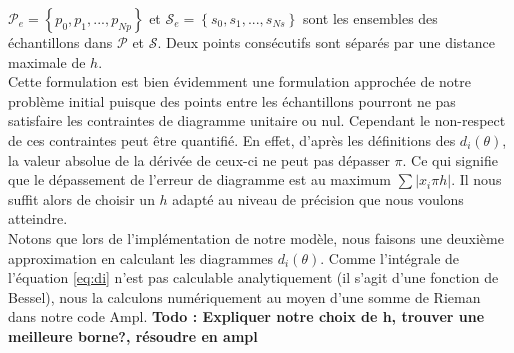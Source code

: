 $\mathcal{P}_e = \left\lbrace p_0,p_1,...,p_{Np}\right\rbrace$ et $\mathcal{S}_e= \left\lbrace s_0,s_1,...,s_{Ns}\right\rbrace$ sont les ensembles des échantillons dans $\mathcal{P}$ et $\mathcal{S}$. Deux points consécutifs sont séparés par une distance maximale de $h$.\\
Cette formulation est bien évidemment une formulation approchée de notre problème initial puisque des points entre les échantillons pourront ne pas satisfaire les contraintes de diagramme unitaire ou nul. Cependant le non-respect de ces contraintes peut être quantifié. En effet, d'après les définitions des $d_i(\theta)$, la valeur absolue de la dérivée de ceux-ci ne peut pas dépasser $\pi$. Ce qui signifie que le dépassement de l'erreur de diagramme est au maximum $\sum |x_i\pi h|$. Il nous suffit alors de choisir un $h$ adapté au niveau de précision que nous voulons atteindre. 
\\
Notons que lors de l'implémentation de notre modèle, nous faisons une deuxième approximation en calculant les diagrammes $d_i(\theta)$. Comme l'intégrale de l'équation \eqref{eq:di} n'est pas calculable analytiquement (il s'agit d'une fonction de Bessel), nous la calculons numériquement au moyen d'une somme de Rieman dans notre code Ampl.
\textbf{Todo : Expliquer notre choix de h, trouver une meilleure borne?, résoudre en ampl}		\\

